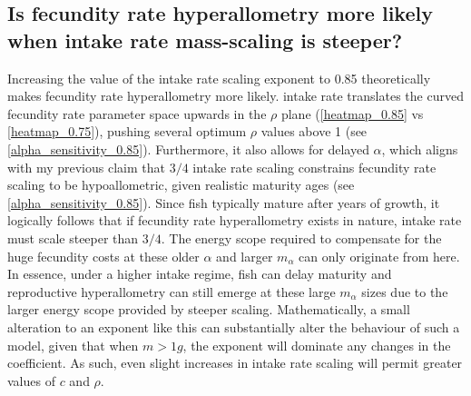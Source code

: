 \documentclass[a4paper]{article} %
\begin{document}
\subsection{Is fecundity rate hyperallometry more likely when intake rate mass-scaling is steeper?}
Increasing the value of the intake rate scaling exponent to 0.85 theoretically makes fecundity rate hyperallometry more likely. intake rate translates the curved fecundity rate parameter space upwards in the $\rho$ plane (\cref{heatmap_0.85} vs \cref{heatmap_0.75}), pushing several optimum $\rho$ values above 1 (see \cref{alpha_sensitivity_0.85}). Furthermore, it also allows for delayed $\alpha$, which aligns with my previous claim that $3/4$ intake rate scaling constrains fecundity rate scaling to be hypoallometric, given realistic maturity ages (see \cref{alpha_sensitivity_0.85}). Since fish typically mature after years of growth, it logically follows that if fecundity rate hyperallometry exists in nature, intake rate must scale steeper than $3/4$. The energy scope required to compensate for the huge fecundity costs at these older $\alpha$ and larger $m_{\alpha}$ can only originate from here. In essence, under a higher intake regime, fish can delay maturity and reproductive hyperallometry can still emerge at these large $m_{\alpha}$ sizes due to the larger energy scope provided by steeper scaling. Mathematically, a small alteration to an exponent like this can substantially alter the behaviour of such a model, given that when $m > 1 g$, the exponent will dominate any changes in the coefficient. As such, even slight increases in intake rate scaling will permit greater values of $c$ and $\rho$. 
\end{document}
